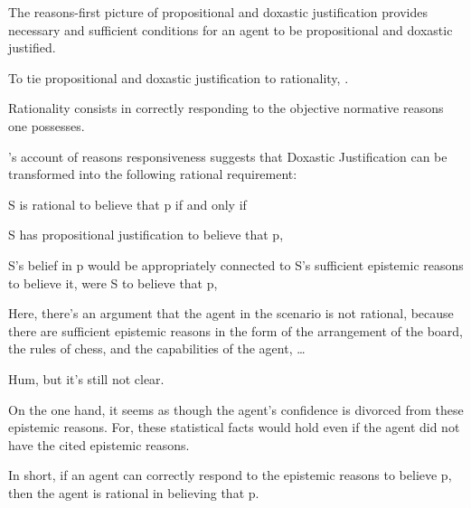 \documentclass[10pt]{article}
\begin{document}
The reasons-first picture of propositional and doxastic justification provides necessary and sufficient conditions for an agent to be propositional and doxastic justified.

\begin{note}
  To tie propositional and doxastic justification to rationality, \citeauthor{Lord:2017aa}.
\end{note}

\begin{description}[font=\bfseries, leftmargin=.75cm, style=nextline]
\item[Reasons Responsiveness:] Rationality consists in correctly responding to the objective normative reasons one possesses.
\end{description}

\citeauthor{Lord:2017aa}'s account of reasons responsiveness suggests that Doxastic Justification can be transformed into the following rational requirement:

\begin{description}[font=\bfseries, leftmargin=.75cm, style=nextline]
\item[Doxastic Requirement (DR):] S is rational to believe that p if and only if
  \begin{enumerate*}[label=(\roman*)]
  \item S has propositional justification to believe that p,
  \item S's belief in p would be appropriately connected to S's sufficient epistemic reasons to believe it, were S to believe that p,
  \end{enumerate*}
\end{description}

\begin{note}
  Here, there's an argument that the agent in the scenario is not rational, because there are sufficient epistemic reasons in the form of the arrangement of the board, the rules of chess, and the capabilities of the agent, \dots

  Hum, but it's still not clear.

  On the one hand, it seems as though the agent's confidence is divorced from these epistemic reasons.
  For, these statistical facts would hold even if the agent did not have the cited epistemic reasons.
\end{note}

In short, if an agent can correctly respond to the epistemic reasons to believe p, then the agent is rational in believing that p.
\end{document}
